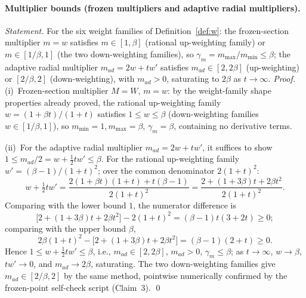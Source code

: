 \documentclass[11pt]{article}
\newcommand{\W}{W}
\numberwithin{equation}{section}
\begin{document}
\paragraph{Multiplier bounds (frozen multipliers and adaptive radial multipliers).}
\emph{Statement.} For the six weight families of Definition~\ref{def:w}: the frozen-section multiplier $m=w$ satisfies $m\in[1,\beta]$ (rational up-weighting family) or $m\in[1/\beta,1]$ (the two down-weighting families), so $\gamma_m=m_{\max}/m_{\min}\le\beta$; the adaptive radial multiplier $m_{ad}=2w+tw'$ satisfies $m_{ad}\in[2,2\beta]$ (up-weighting) or $[2/\beta,2]$ (down-weighting), with $m_{ad}>0$, saturating to $2\beta$ as $t\to\infty$.
\emph{Proof.} (i)~Frozen-section multiplier $M=\W$, $m=w$: by the weight-family shape properties already proved, the rational up-weighting family $w=(1+\beta t)/(1+t)$ satisfies $1\le w\le\beta$ (down-weighting families $w\in[1/\beta,1]$), so $m_{\min}=1,m_{\max}=\beta$, $\gamma_m=\beta$, containing no derivative terms.
\par\noindent(ii)~For the adaptive radial multiplier $m_{ad}=2w+tw'$, it suffices to show $1\le m_{ad}/2=w+\tfrac12tw'\le\beta$. For the rational up-weighting family $w'=(\beta-1)/(1+t)^2$; over the common denominator $2(1+t)^2$:
\[
w+\tfrac12tw'=\frac{2(1+\beta t)(1+t)+t(\beta-1)}{2(1+t)^2}
=\frac{2+(1+3\beta)t+2\beta t^2}{2(1+t)^2}.
\]
Comparing with the lower bound $1$, the numerator difference is
\[
\bigl[2+(1+3\beta)t+2\beta t^2\bigr]-2(1+t)^2=(\beta-1)t(3+2t)\ge0;
\]
comparing with the upper bound $\beta$,
\[
2\beta(1+t)^2-\bigl[2+(1+3\beta)t+2\beta t^2\bigr]=(\beta-1)(2+t)\ge0.
\]
Hence $1\le w+\tfrac12tw'\le\beta$, i.e., $m_{ad}\in[2,2\beta]$, $m_{ad}>0$, $\gamma_m\le\beta$; as $t\to\infty$, $w\to\beta$, $tw'\to0$, and $m_{ad}\to2\beta$, saturating. The two down-weighting families give $m_{ad}\in[2/\beta,2]$ by the same method, pointwise numerically confirmed by the frozen-point self-check script (Claim~3). \qed
\end{document}
